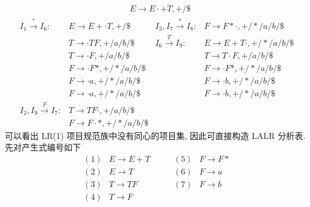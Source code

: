 \documentclass[boxes]{homework}
\begin{document}
\begin{solution}
\begin{equation}
\begin{aligned}
                                        & E \to E \cdot + T, + / \$
        \end{aligned}
    \end{equation}
    \begin{equation}
        \begin{aligned}
            I_{1}\xrightarrow{+} I_{6}:        & E \to E + \cdot T, + / \$           & I_{3}, I_{7}\xrightarrow{*} I_{8}: & F \to F* \cdot, + / * / a / b / \$    \\
                                               & T \to \cdot T F, + / a / b / \$     & I_{6}\xrightarrow{T} I_{9}:        & E \to E + T \cdot, + / * / a / b / \$ \\
                                               & T \to \cdot F, + / a / b / \$       &                                    & T \to T \cdot F, + / a / b / \$       \\
                                               & F \to \cdot F *, + / * / a / b / \$ &                                    & F \to \cdot F *, + / * / a / b / \$   \\
                                               & F \to \cdot a, + / * / a / b / \$   &                                    & F \to \cdot b, + / * / a / b / \$     \\
                                               & F \to \cdot a, + / * / a / b / \$   &                                    & F \to \cdot b, + / * / a / b / \$     \\
            I_{2}, I_{9}\xrightarrow{F} I_{7}: & T \to TF \cdot, + / a / b / \$                                                                                   \\
                                               & F \to F \cdot *, + / * / a / b / \$
        \end{aligned}
    \end{equation}
    可以看出 LR\.(1) 项目规范族中没有同心的项目集, 因此可直接构造 LALR 分析表.
    先对产生式编号如下
    \begin{equation}
        \begin{aligned}
            (1) & E \to E + T & \qquad  (5) & F \to F * \\
            (2) & E \to T     & \qquad  (6) & F \to a   \\
            (3) & T \to T F   & \qquad  (7) & F \to b   \\
            (4) & T \to F     & \qquad
        \end{aligned}
    \end{equation}

\end{solution}
\end{document}
